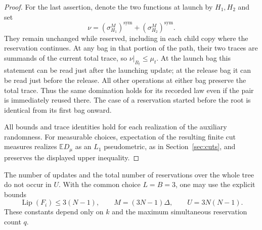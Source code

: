 \begin{proof}
For the last assertion, denote the two functions at launch by $H_1,H_2$
and set
\[
 \nu=(\sigma_{H_1}^M)^{\mathrm{sym}}
       +(\sigma_{H_2}^M)^{\mathrm{sym}}.
\]
They remain unchanged while reserved, including in each child copy
where the reservation continues.  At any bag in that portion of the
path, their two traces are summands of the current total trace, so
$\nu|_{B_t}\le\mu_t$.  At the launch bag this statement can be read just
after the launching update; at the release bag it can be read just
before the release.  All other operations at either bag preserve the
total trace.  Thus the same domination holds for its recorded law even
if the pair is immediately reused there.  The case of a reservation
started before the root is identical from its first bag onward.

All bounds and trace identities hold for each realization of the
auxiliary randomness.  For measurable choices, expectation of the
resulting finite cut measures realizes $\mathbb E D_\mu$ as an $L_1$
pseudometric, as in Section~\ref{sec:cuts}, and preserves the displayed
upper inequality.
\end{proof}

The number of updates and the total number of reservations over the
whole tree do not occur in $U$.  With the common choice $L=B=3$, one may
use the explicit bounds
\[
 \operatorname{Lip}(F_i)\le3(N-1),\qquad
 M=(3N-1)\Delta,\qquad U=3N(N-1).
\]
These constants depend only on $k$ and the maximum simultaneous
reservation count $q$.

